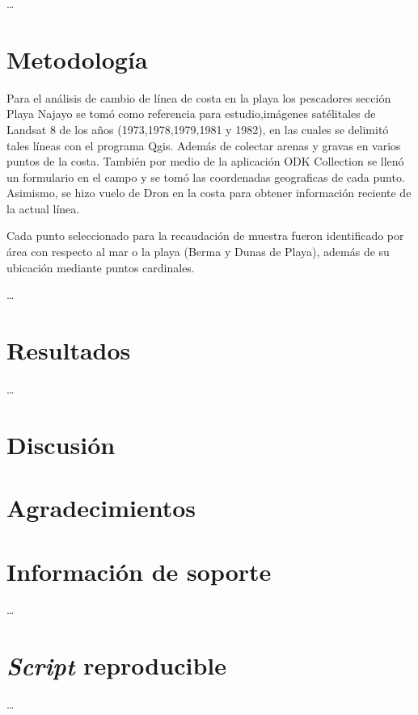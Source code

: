 \documentclass[11pt,]{article}
\begin{document}
\ldots

\section{Metodología}\label{metodologuxeda}

Para el análisis de cambio de línea de costa en la playa los pescadores
sección Playa Najayo se tomó como referencia para estudio,imágenes
satélitales de Landsat 8 de los años (1973,1978,1979,1981 y 1982), en
las cuales se delimitó tales líneas con el programa Qgis. Además de
colectar arenas y gravas en varios puntos de la costa. También por medio
de la aplicación ODK Collection se llenó un formulario en el campo y se
tomó las coordenadas geograficas de cada punto. Asimismo, se hizo vuelo
de Dron en la costa para obtener información reciente de la actual
línea.

Cada punto seleccionado para la recaudación de muestra fueron
identificado por área con respecto al mar o la playa (Berma y Dunas de
Playa), además de su ubicación mediante puntos cardinales.

\ldots

\section{Resultados}\label{resultados}

\ldots

\section{Discusión}\label{discusiuxf3n}

\section{Agradecimientos}\label{agradecimientos}

\section{Información de soporte}\label{informaciuxf3n-de-soporte}

\ldots

\section{\texorpdfstring{\emph{Script}
reproducible}{Script reproducible}}\label{script-reproducible}

\ldots
\end{document}
